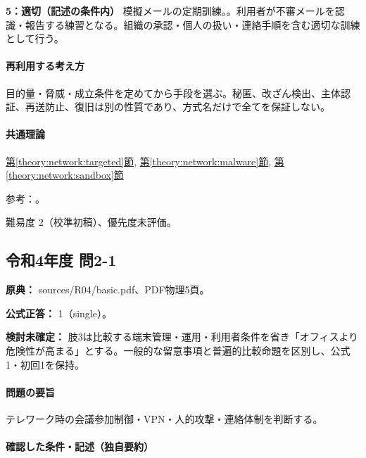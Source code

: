 \noindent\textbf{5：適切（記述の条件内）} 模擬メールの定期訓練。。利用者が不審メールを認識・報告する練習となる。組織の承認・個人の扱い・連絡手順を含む適切な訓練として行う。\par

\paragraph{再利用する考え方} 目的量・脅威・成立条件を定めてから手段を選ぶ。秘匿、改ざん検出、主体認証、再送防止、復旧は別の性質であり、方式名だけで全てを保証しない。

\paragraph{共通理論} \hyperref[theory:network:targeted]{第\ref*{theory:network:targeted}節}, \hyperref[theory:network:malware]{第\ref*{theory:network:malware}節}, \hyperref[theory:network:sandbox]{第\ref*{theory:network:sandbox}節}

\par 参考：\cite{net_target2020,net_target2023}。

\par 難易度 2（校準初稿）、優先度未評価。

\subsection{令和4年度 問2-1}
\label{q:r04-reg-basic-2-1}

\noindent\textbf{原典：} sources/R04/basic.pdf、PDF物理5頁。

\textbf{公式正答：} 1（single）。

\par\textbf{検討未確定：} 肢3は比較する端末管理・運用・利用者条件を省き「オフィスより危険性が高まる」とする。一般的な留意事項と普遍的比較命題を区別し、公式1・初回1を保持。

\paragraph{問題の要旨} テレワーク時の会議参加制御・VPN・人的攻撃・連絡体制を判断する。

\paragraph{確認した条件・記述（独自要約）}\mbox{}\par

